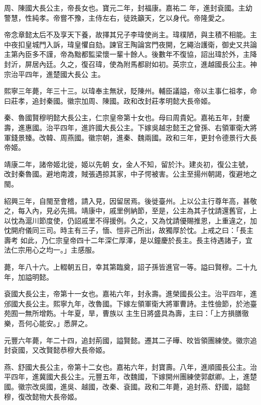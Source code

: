 \begin{pinyinscope}
 周、陳國大長公主，帝長女也。寶元二年，封福康。嘉祐二
 年，進封袞國。主幼警慧，性純孝。帝嘗不豫，主侍左右，徒跣籲天，乞以身代。帝隆愛之。



 帝念章懿太后不及享天下養，故擇其兄子李瑋使尚主。瑋樸陋，與主積不相能。主中夜扣皇城門入訴，瑋皇懼自劾。諫官王陶論宮門夜開，乞繩治護衛，御史又共論主第內臣多不謹，帝為黜都監梁懷一輩十餘人。後數年不復協，詔出瑋於外，主降封沂，屏居內廷。久之，復召瑋，使為附馬都尉如初。英宗立，進越國長公主。神宗治平四年，進楚國大長公
 主。



 熙寧三年薨，年三十三。以瑋奉主無狀，貶陳州。輔臣議謚，帝以主事仁祖孝，命曰莊孝，追封秦國。徽宗加周、陳國。政和改封莊孝明懿大長帝姬。



 秦、魯國賢穆明懿大長公主，仁宗皇帝第十女也。母曰周貴妃。嘉祐五年，封慶壽，進惠國。治平四年，進許國大長公主。下嫁吳越忠懿王之曾孫、右領軍衛大將軍錢景臻。改韓、周燕國。徽宗朝，進秦、魏兩國。政和三年，更封令德景行大長帝姬。



 靖康二年，諸帝姬北徙，姬以先朝
 女，金人不知，留於汴。建炎初，復公主號，改封秦魯國。避地南渡，賊張遇掠其家，中子愕被害。公主至揚州朝謁，復避地之閩。



 紹興三年，自閩至會稽，請入見，因留居焉。後徙臺州。上以公主行尊年高，甚敬之，每入內，見必先揖。靖康中，戚里例納節，至是，公主為其子忱請還舊官，上以忱為滬川節度使，仍詔戚里不得援例。久之，又為忱請優賜推恩，上重違之，加忱開府儀同三司。時主有三子，愐、愷非己所出，故獨厚於忱。上戒之曰：「長主壽考
 如此，乃仁宗皇帝四十二年深仁厚澤，是以鐘慶於長主。長主待遇諸子，宜法仁宗用心之均一。」主感服。



 薨，年八十六。上輟朝五日，幸其第臨奠，詔子孫皆進官一等。謚曰賢穆。二十九年，加謚明懿。



 袞國大長公主，帝第十一女也。嘉祐六年，封永壽。進榮國長公主。治平四年，進邠國大長公主。熙寧九年，改魯國。下嫁左領軍衛大將軍曹詩。主性儉節，於池臺苑囿一無所增飭。十年夏，旱，曹族以
 主生日將盛具為壽，主曰：「上方損膳徹樂，吾何心能安。」悉屏之。



 元豐六年薨，年二十四，追封荊國，謚賢懿。遷其二子曄、旼皆領團練使。徽宗追封袞國，又改賢懿恭穆大長帝姬。



 燕、舒國大長公主，帝第十二女也。嘉祐六年，封寶壽。八年，進順國長公主。治平四年，進冀國大長公主。元豐五年，改魏國，下嫁開州團練使郭獻卿。上，進楚國。徽宗改吳國，進吳、越國，改秦、袞國。政和二年薨，追封燕、舒國，謚懿穆，復改懿物大長帝姬。




\end{pinyinscope}
